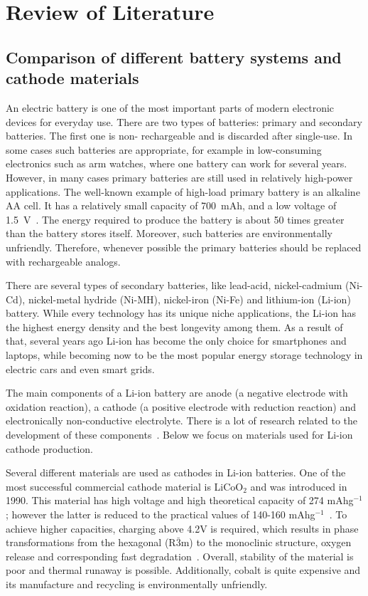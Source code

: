 \chapter{Review of Literature}
\section{Comparison of different battery systems and cathode materials}

An electric battery is one of the most important parts of modern electronic devices for everyday use.  There are two types of batteries: primary and secondary batteries. The first one is non- rechargeable and is discarded after single-use. In some cases such batteries are appropriate, for example in low-consuming electronics such as arm watches, where one battery can work for several years. However, in many cases primary batteries are still used in relatively high-power applications. The well-known example of high-load primary battery is an alkaline AA cell. It has a relatively small capacity of 700~mAh, and a low voltage of 1.5~V~\cite{david2001handbook}. The energy required to produce the battery is about 50 times greater than the battery stores itself. Moreover, such batteries are environmentally unfriendly. Therefore, whenever possible the primary batteries should be replaced with rechargeable analogs. 

There are several types of secondary batteries, like lead-acid, nickel-cadmium (Ni-Cd), nickel-metal hydride (Ni-MH), nickel-iron (Ni-Fe) and lithium-ion (Li-ion) battery. While every technology has its unique niche applications, the Li-ion has the highest energy density and the best longevity among them. As a result of that, several years ago Li-ion has become the only choice for smartphones and laptops, while becoming now to be the most popular energy storage technology in electric cars and even smart grids.  

The main components of a Li-ion battery are anode (a negative electrode with oxidation reaction), a cathode (a positive electrode with reduction reaction) and electronically non-conductive electrolyte. There is a lot of research related to the development of these components~\cite{wang2002investigation, ruess2017dye}. Below we focus on materials used for Li-ion cathode production. 

Several different materials are used as cathodes in Li-ion batteries. One of the most successful commercial cathode material is LiCoO$_2$ and was introduced in 1990. This material has  high voltage and high theoretical capacity  of 274 mAhg$^{-1}$; however the latter is reduced to the practical values of 140-160 mAhg$^{-1}$~\cite{luo2012binder}. To achieve higher capacities,  charging above 4.2V is required, which results in phase transformations from the hexagonal (R$\bar3$m) to the monoclinic structure, oxygen release and corresponding fast degradation~\cite{choi2002factors}. Overall, stability of the material is poor and thermal runaway is possible. Additionally, cobalt is quite expensive and its manufacture and recycling is environmentally unfriendly.

